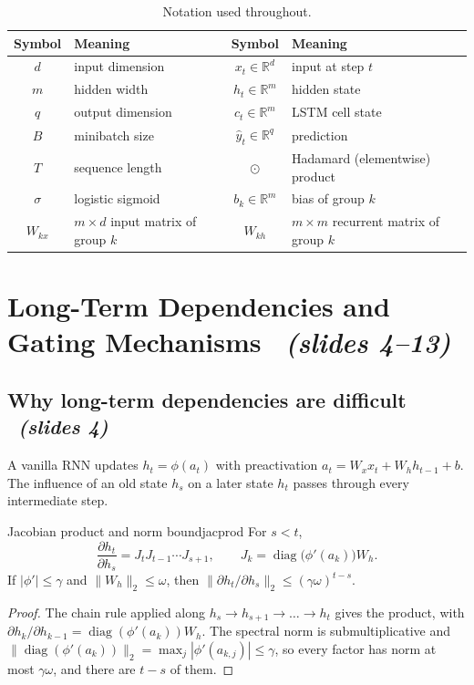 \documentclass[11pt,a4paper]{article}
\newcommand{\R}{\mathbb{R}}
\newcommand{\diag}{\operatorname{diag}}
\newcommand{\sltag}[1]{\texorpdfstring{\ \emph{(slides #1)}}{ (slides #1)}}
\begin{document}
\begin{table}[H]\centering
\begin{tabular}{@{}cl@{\qquad}cl@{}}
\toprule
Symbol & Meaning & Symbol & Meaning\\ \midrule
$d$ & input dimension & $x_t\in\R^d$ & input at step $t$\\
$m$ & hidden width & $h_t\in\R^m$ & hidden state\\
$q$ & output dimension & $c_t\in\R^m$ & LSTM cell state\\
$B$ & minibatch size & $\hat y_t\in\R^q$ & prediction\\
$T$ & sequence length & $\odot$ & Hadamard (elementwise) product\\
$\sigma$ & logistic sigmoid & $b_k\in\R^m$ & bias of group $k$\\
$W_{kx}$ & $m\times d$ input matrix of group $k$ & $W_{kh}$ & $m\times m$ recurrent matrix of group $k$\\
\bottomrule
\end{tabular}
\caption{Notation used throughout.}
\end{table}

\section{Long-Term Dependencies and Gating Mechanisms \sltag{4--13}}

\subsection{Why long-term dependencies are difficult \sltag{4}}

A vanilla RNN updates $h_t=\phi(a_t)$ with preactivation $a_t=W_xx_t+W_hh_{t-1}+b$. The influence of an old state $h_s$ on a later state $h_t$ passes through every intermediate step.

\begin{proposition}{Jacobian product and norm bound}{jacprod}
For $s<t$,
\[
\frac{\partial h_t}{\partial h_s}=J_tJ_{t-1}\cdots J_{s+1},\qquad J_k=\diag\big(\phi'(a_k)\big)W_h .
\]
If $|\phi'|\le\gamma$ and $\|W_h\|_2\le\omega$, then $\big\|\partial h_t/\partial h_s\big\|_2\le(\gamma\omega)^{t-s}$.
\end{proposition}
\begin{proof}
The chain rule applied along $h_s\to h_{s+1}\to\dots\to h_t$ gives the product, with $\partial h_k/\partial h_{k-1}=\diag(\phi'(a_k))W_h$. The spectral norm is submultiplicative and $\|\diag(\phi'(a_k))\|_2=\max_j|\phi'(a_{k,j})|\le\gamma$, so every factor has norm at most $\gamma\omega$, and there are $t-s$ of them.
\end{proof}
\end{document}
